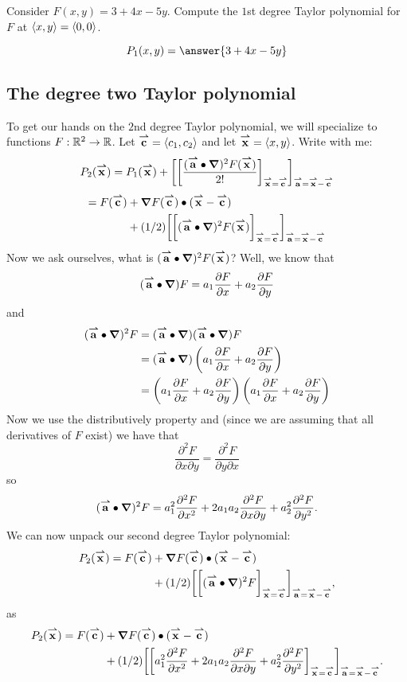 \documentclass{ximera}
\begin{document}
\begin{question}
  Consider $F(x,y)= 3+4x-5y$. Compute the $1$st degree Taylor
  polynomial for $F$ at $\vector{x,y} =\vector{0,0}$.
  \begin{prompt}
    \[
    P_1(x,y) = \answer{3+4x-5y}
    \]
  \end{prompt}
\end{question}

\subsection{The  degree two Taylor polynomial}
To get our hands on the $2$nd degree Taylor polynomial, we will
specialize to functions $F:\R^2\to\R$. Let $\vec{c}=\vector{c_1,c_2}$
and let $\vec{x} = \vector{x,y}$.  Write with me:
\[
P_2(\vec{x}) = P_1(\vec{x}) + \eval{\eval{\frac{(\vec{a}\dotp \grad)^2 F(\vec{x})}{2!}}_{\vec{x}=\vec{c}}}_{\vec{a}=\vec{x}-\vec{c}}
\]
\begin{align*}
  = F(\vec{c})
  &+ \grad F(\vec{c})\dotp (\vec{x}-\vec{c})\\
  &+(1/2)\eval{\eval{(\vec{a}\dotp \grad)^2 F(\vec{x})}_{\vec{x}=\vec{c}}}_{\vec{a}=\vec{x}-\vec{c}}
\end{align*}
Now we ask ourselves, what is $(\vec{a}\dotp \grad)^2 F(\vec{x})$?
Well, we know that
\[
(\vec{a}\dotp\grad)F = a_1 \pp[F]{x} + a_2 \pp[F]{y}
\]
and 
\begin{align*}
(\vec{a}\dotp\grad)^2F &=(\vec{a}\dotp\grad)(\vec{a}\dotp\grad)F\\
  &= (\vec{a}\dotp\grad)\left(a_1 \pp[F]{x} + a_2 \pp[F]{y}\right)\\
  &= \left(a_1 \pp[F]{x} + a_2 \pp[F]{y}\right)\left(a_1 \pp[F]{x} + a_2 \pp[F]{y}\right)
\end{align*}
Now we use the distributively property and (since we are assuming that
all derivatives of $F$ exist) we have that
\[
\frac{\partial^2F}{\partial x\partial y}  = \frac{\partial^2F}{\partial y\partial x}
\]
so
\[
(\vec{a}\dotp\grad)^2F = a_1^2\frac{\partial^2F}{\partial x^2} + 2a_1
a_2\frac{\partial^2F}{\partial x\partial y} +
a_2^2\frac{\partial^2F}{\partial y^2}.
\]
We can now unpack our second degree Taylor polynomial:
\begin{align*}
  P_2(\vec{x})= F(\vec{c})
&+ \grad F(\vec{c})\dotp (\vec{x}-\vec{c})\\
&+(1/2)\eval{\eval{(\vec{a}\dotp\grad)^2F}_{\vec{x}=\vec{c}}}_{\vec{a}=\vec{x}-\vec{c}},
\end{align*}
as
\begin{align*}
P_2(\vec{x})=F(\vec{c})
&+ \grad F(\vec{c})\dotp (\vec{x}-\vec{c})\\
&+(1/2)\eval{\eval{a_1^2\frac{\partial^2F}{\partial x^2} + 2a_1 
a_2\frac{\partial^2F}{\partial x\partial y} +
a_2^2\frac{\partial^2F}{\partial y^2}}_{\vec{x}=\vec{c}}}_{\vec{a}=\vec{x}-\vec{c}}.
\end{align*}
\end{document}
